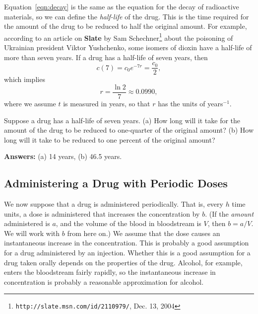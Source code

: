 Equation~\eqref{eqn:decay}
is the same as the equation for the decay of
radioactive materials, so we can define the
\emph{half-life} of the drug. This is the time
required for the amount of the drug to be reduced
to half the original amount.
For example, according to an article on
\textbf{Slate} by Sam Schechner\footnote{\texttt{http://slate.msn.com/id/2110979/}, Dec. 13, 2004}
about the poisoning of Ukrainian president
Viktor Yushchenko, some isomers of 
dioxin have a half-life of more than seven years.
If a drug has a half-life of seven years, then
\begin{equation}
   c(7) = c_0e^{-7r} = \frac{c_0}{2},
\end{equation}
which implies
\begin{equation}
   r = \frac{\ln 2}{7} \approx 0.0990,
\end{equation}
where we assume $t$ is measured in years, so that 
$r$ has the units of years$^{-1}$.
\begin{question}
Suppose a drug has a half-life of seven years.
(a) How long will it take for the amount of the drug to
be reduced to one-quarter of the original amount?
(b) How long will it take to be reduced to one percent of the 
original amount?

\hfill \textbf{Answers:} (a) 14 years, (b) 46.5 years.
\end{question}

\subsection*{Administering a Drug with Periodic Doses}
We now suppose that a drug is administered periodically.
That is, every $h$ time units, a dose is administered that
increases the concentration by $b$.
(If the \emph{amount} administered is $a$, and the volume
of the blood in bloodstream is $V$, then $b=a/V$.
We will work with $b$ from here on.)
We assume that the dose causes an instantaneous increase
in the concentration.  This is probably a
good assumption for a drug administered by an injection.
Whether this is a good assumption for a drug taken
orally depends on the properties of the drug.
Alcohol, for example, enters the bloodstream fairly
rapidly, so the instantaneous increase in concentration
is probably a reasonable approximation for alcohol.

